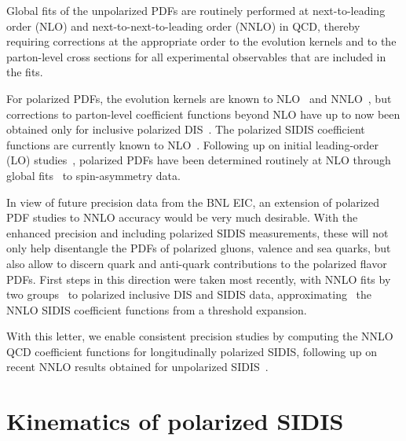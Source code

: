 \documentclass[10pt,aps,prl,twocolumn,preprintnumbers,nofootinbib]{revtex4-2}
\begin{document}
Global fits of the unpolarized PDFs are routinely performed 
at next-to-leading order (NLO) and next-to-next-to-leading order (NNLO) in QCD, thereby requiring corrections at the  appropriate order to the evolution kernels and to the parton-level cross sections
for all experimental observables that 
are included in the fits.

For polarized PDFs, the evolution kernels are known to 
NLO~\cite{Vogelsang:1996im,Mertig:1995ny} and 
NNLO~\cite{Moch:2014sna,Blumlein:2021enk,Blumlein:2021ryt}, but  corrections
to parton-level coefficient functions beyond NLO have up to now been 
obtained
only for inclusive polarized 
DIS~\cite{Zijlstra:1993sh,Blumlein:2022gpp}. The polarized SIDIS coefficient functions are currently known 
to NLO~\cite{deFlorian:1997zj}.
Following up on initial leading-order (LO)
studies~\cite{Gluck:1988uj,Altarelli:1988mu}, 
polarized PDFs have been determined routinely at NLO through 
global fits~\cite{Gluck:1995yr,Gehrmann:1995ag,AsymmetryAnalysis:1999gsr,deFlorian:2008mr,deFlorian:2009vb,deFlorian:2014yva,Blumlein:2010rn,Nocera:2014gqa}
to spin-asymmetry data. 


In view of future precision 
data from the BNL EIC, an extension of 
polarized PDF studies to NNLO accuracy would be very much 
desirable.  
With the enhanced precision and including 
polarized SIDIS measurements, these 
will not only help disentangle the PDFs of polarized gluons, valence and sea quarks, but also allow to discern quark and anti-quark contributions to the polarized flavor PDFs.
First steps in this direction were taken most 
recently, with NNLO fits by two groups~\cite{Bertone:2024taw,Borsa:2024mss} to
polarized inclusive DIS and SIDIS data, approximating~\cite{Abele:2021nyo} the 
NNLO SIDIS coefficient functions from a threshold expansion. 

With this letter, we enable consistent
precision studies by computing
the NNLO QCD coefficient functions for longitudinally 
polarized SIDIS, following up on recent NNLO results obtained 
for unpolarized SIDIS~\cite{Goyal:2023zdi,Bonino:2024qbh}.

\section{Kinematics of polarized SIDIS}
\end{document}

